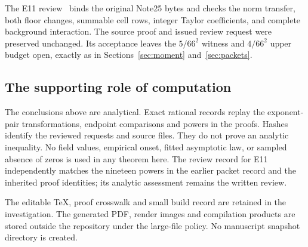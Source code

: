 The E11 review~\cite{BBReview11} binds the original Note25 bytes and
checks the norm transfer, both floor changes, summable cell rows,
integer Taylor coefficients, and complete background interaction.
The source proof and issued review request were preserved unchanged.
Its acceptance leaves the $5/66^2$ witness and $4/66^2$ upper budget
open, exactly as in Sections~\ref{sec:moment} and~\ref{sec:packets}.

\subsection{The supporting role of computation}

The conclusions above are analytical. Exact rational records replay
the exponent-pair transformations, endpoint comparisons and powers in
the proofs. Hashes identify the reviewed requests and source files.
They do not prove an analytic inequality. No field values, empirical
onset, fitted asymptotic law, or sampled absence of zeros is used in
any theorem here. The review record for E11 independently matches the
nineteen powers in the earlier packet record and the inherited proof
identities; its analytic assessment remains the written review.

The editable TeX, proof crosswalk and small build record are retained
in the investigation. The generated PDF, render images and compilation
products are stored outside the repository under the large-file policy.
No manuscript snapshot directory is created.
